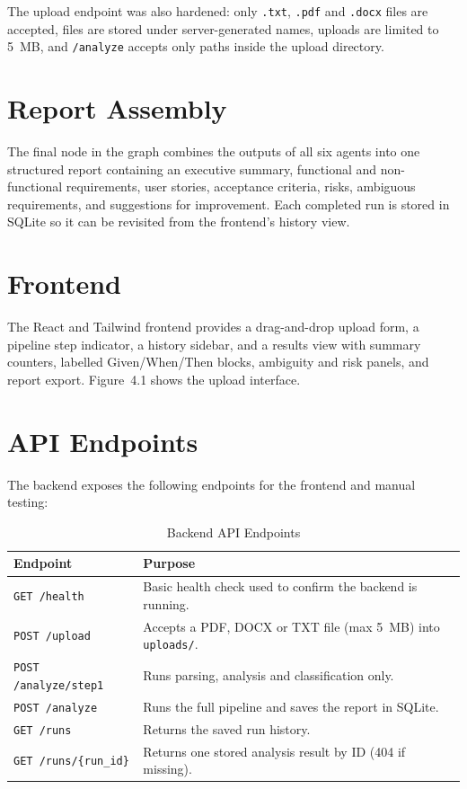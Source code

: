 The upload endpoint was also hardened: only \texttt{.txt}, \texttt{.pdf}
and \texttt{.docx} files are accepted, files are stored under
server-generated names, uploads are limited to 5~MB, and \texttt{/analyze}
accepts only paths inside the upload directory.

\clearpage
\setcounter{section}{5}
\enlargethispage{6pt}
\section{Report Assembly}
\post
The final node in the graph combines the outputs of all six agents into
one structured report containing an executive summary, functional and
non-functional requirements, user stories, acceptance criteria, risks,
ambiguous requirements, and suggestions for improvement. Each completed
run is stored in SQLite so it can be revisited from the frontend's history
view.

\vspace{44pt}
\section{Frontend}
\post
The React and Tailwind frontend provides a drag-and-drop upload form, a
pipeline step indicator, a history sidebar, and a results view with summary
counters, labelled Given/When/Then blocks, ambiguity and risk panels, and
report export. Figure~4.1 shows the upload interface.

\vspace{44pt}
\section{API Endpoints}
\post
The backend exposes the following endpoints for the frontend and manual
testing:

\vspace{27.4pt}
\begin{table}[H]
\centering
\caption{Backend API Endpoints}
\label{tab:api}
\begin{tabularx}{\textwidth}{|p{3.2cm}|X|}
\hline
\textbf{Endpoint} & \textbf{Purpose} \\
\hline
\texttt{GET /health} & Basic health check used to confirm the backend is running. \\
\hline
\texttt{POST /upload} & Accepts a PDF, DOCX or TXT file (max 5~MB) into \texttt{uploads/}. \\
\hline
\texttt{POST /analyze/step1} & Runs parsing, analysis and classification only. \\
\hline
\texttt{POST /analyze} & Runs the full pipeline and saves the report in SQLite. \\
\hline
\texttt{GET /runs} & Returns the saved run history. \\
\hline
\texttt{GET /runs/\{run\_id\}} & Returns one stored analysis result by ID (404 if missing). \\
\hline
\end{tabularx}
\end{table}

